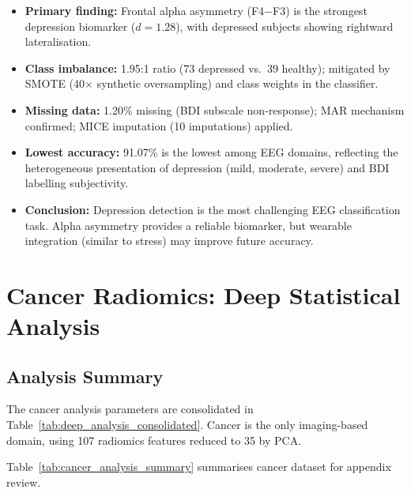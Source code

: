 \begin{itemize}
\item \textbf{Primary finding:} Frontal alpha asymmetry (F4$-$F3) is the strongest depression biomarker ($d = 1.28$), with depressed subjects showing rightward lateralisation.
\item \textbf{Class imbalance:} 1.95:1 ratio (73 depressed vs.\ 39 healthy); mitigated by SMOTE (40$\times$ synthetic oversampling) and class weights in the classifier.
\item \textbf{Missing data:} 1.20\% missing (BDI subscale non-response); MAR mechanism confirmed; MICE imputation (10 imputations) applied.
\item \textbf{Lowest accuracy:} 91.07\% is the lowest among EEG domains, reflecting the heterogeneous presentation of depression (mild, moderate, severe) and BDI labelling subjectivity.
\item \textbf{Conclusion:} Depression detection is the most challenging EEG classification task. Alpha asymmetry provides a reliable biomarker, but wearable integration (similar to stress) may improve future accuracy.
\end{itemize}

\section{Cancer Radiomics: Deep Statistical Analysis}
\label{app:deep_cancer}

\subsection{Analysis Summary}

The cancer analysis parameters are consolidated in Table~\ref{tab:deep_analysis_consolidated}. Cancer is the only imaging-based domain, using 107 radiomics features reduced to 35 by PCA.

\iffalse %
\label{tab:cancer_analysis_summary}
\noindent Table~\ref{tab:cancer_analysis_summary} summarises cancer dataset for appendix review.


